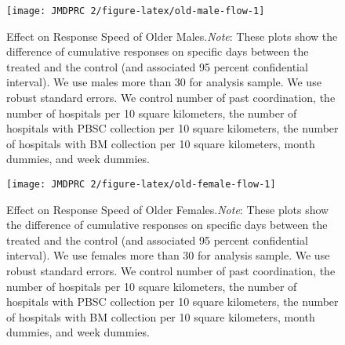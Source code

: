 \documentclass[12pt, a4paper]{article}
\begin{document}
\begin{figure}[H]
\texttt{[image: JMDPRC~2/figure-latex/old-male-flow-1]} \caption{Effect on Response Speed of Older Males.\newline \emph{Note}: These plots show the difference of cumulative responses on specific days between the treated and the control (and associated 95 percent confidential interval). We use males more than 30 for analysis sample. We use robust standard errors. We control number of past coordination, the number of hospitals per 10 square kilometers, the number of hospitals with PBSC collection per 10 square kilometers, the number of hospitals with BM collection per 10 square kilometers, month dummies, and week dummies.}\label{fig:old-male-flow}
\end{figure}

\begin{figure}[H]
\texttt{[image: JMDPRC~2/figure-latex/old-female-flow-1]} \caption{Effect on Response Speed of Older Females.\newline \emph{Note}: These plots show the difference of cumulative responses on specific days between the treated and the control (and associated 95 percent confidential interval). We use females more than 30 for analysis sample. We use robust standard errors. We control number of past coordination, the number of hospitals per 10 square kilometers, the number of hospitals with PBSC collection per 10 square kilometers, the number of hospitals with BM collection per 10 square kilometers, month dummies, and week dummies.}\label{fig:old-female-flow}
\end{figure}
\end{document}
